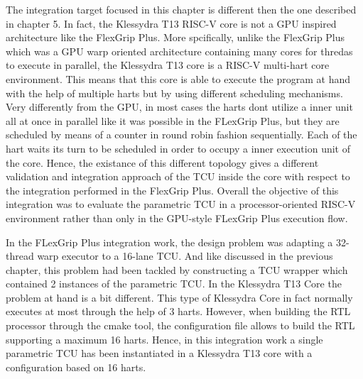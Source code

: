 


The integration target focused in this chapter is different then the one described in chapter 5. In fact, the Klessydra T13 RISC-V core is not a GPU inspired architecture like the FlexGrip Plus. More spcifically, unlike the FlexGrip Plus which was a GPU warp oriented architecture containing many cores for thredas to execute in parallel, the Klessydra T13 core is a RISC-V multi-hart core environment. This means that this core is able to execute the program at hand with the help of multiple harts but by using different scheduling mechanisms. Very differently from the GPU, in most cases the harts dont utilize a inner unit all at once in parallel like it was possible in the FLexGrip Plus, but they are scheduled by means of a counter in round robin fashion sequentially. Each of the hart waits its turn to be scheduled in order to occupy a inner execution unit of the core. Hence, the existance of this different topology gives a different validation and integration approach of the TCU inside the core with respect to the integration performed in the FlexGrip Plus. Overall the objective of this integration was to evaluate the parametric TCU in a processor-oriented RISC-V environment rather than only in the GPU-style FLexGrip Plus execution flow.


In the FLexGrip Plus integration work, the design problem was adapting a 32-thread warp executor to a 16-lane TCU. And like discussed in the previous chapter, this problem had been tackled by constructing a TCU wrapper which contained 2 instances of the parametric TCU. In the Klessydra T13 Core the problem at hand is a bit different. This type of Klessydra Core in fact normally executes at most through the help of 3 harts. However, when building the RTL processor through the cmake tool, the configuration file allows to build the RTL supporting a maximum 16 harts. Hence, in this integration work a single parametric TCU has been instantiated in a Klessydra T13 core with a configuration based on 16 harts.

